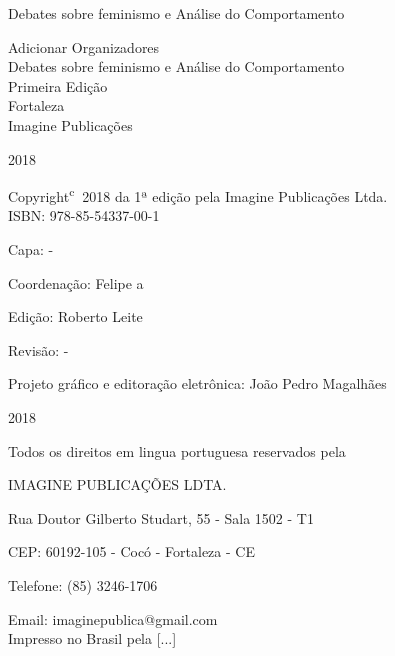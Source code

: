 \documentclass[hidelinks, 4pt]{bookest}
\let\orignewcommand\newcommand  %
\let\newcommand\providecommand  %
\let\newcommand\orignewcommand  %
\newcommand\blankpage{%
    \null
    \thispagestyle{empty}%
    \addtocounter{page}{-1}%
    \newpage}
\begin{document}
%
\begin{titlepage}
\begin{center}
\vspace*{\fill}
{\Huge Debates sobre feminismo e Análise do Comportamento}
\vspace*{\fill}
\pagebreak
\afterpage{\blankpage}
\end{center}
\begin{center}
{\Large Adicionar Organizadores}\\[4cm]
{\Huge Debates sobre feminismo e Análise do Comportamento}\\[4cm]

{\Large Primeira Edição}\\[3cm]


{\large Fortaleza\\
Imagine Publicações}

2018
\pagebreak
\thispagestyle{empty}
\end{center}
\pagebreak

Copyright\textsuperscript{\textcircled{c}} 2018 da 1ª edição pela Imagine Publicações Ltda.\\

ISBN: 978-85-54337-00-1

Capa: -

Coordenação: Felipe a

Edição: Roberto Leite

Revisão: -

Projeto gráfico e editoração eletrônica: João Pedro Magalhães\\
\vfill
\begin{center}
\end{center}

2018

Todos os direitos em lingua portuguesa reservados pela

IMAGINE PUBLICAÇÕES LDTA.

Rua Doutor Gilberto Studart, 55 - Sala 1502 - T1

CEP: 60192-105 - Cocó - Fortaleza - CE

Telefone: (85) 3246-1706

Email: imaginepublica@gmail.com\\

Impresso no Brasil pela [...]
\thispagestyle{empty}
\end{titlepage}

\end{document}
